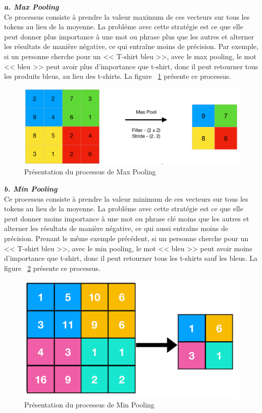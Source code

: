\noindent
{\small\textbf{\textit{a. Max Pooling }}}\mbox{}\\
Ce processus consiste à prendre la valeur maximum de ces vecteurs sur tous les tokens au lieu de la moyenne. La probléme avec cette stratégie est ce que elle peut donner plus importance à une mot ou phrase plus que les autres et alterner les résultats de manière négative, ce qui entraîne moins de précision. Par exemple, si un personne cherche pour un << T-shirt bleu >>, avec le max pooling, le mot << bleu >> peut avoir plus d'importance que t-shirt, donc il peut retourner tous les produits bleus, au lieu des t-shirts. La figure ~\ref{fig:maxpooling} présente ce processus. 

\begin{figure}[H]
\centering
\includegraphics[width=1\textwidth]{logos/max_pooling.png}
\caption{Présentation du processus de Max Pooling}
\label{fig:maxpooling}
\end{figure}

\newpage
\noindent
{\small\textbf{\textit{b. Min Pooling }}}\mbox{}\\
Ce processus consiste à prendre la valeur minimum de ces vecteurs sur tous les tokens au lieu de la moyenne. La probléme avec cette stratégie est ce que elle peut donner moins importance à une mot ou phrase clé moins que les autres et alterner les résultats de manière négative, ce qui aussi entraîne moins de précision. Prenant le même exemple précédent, si un personne cherche pour un << T-shirt bleu >>, avec le min pooling, le mot << bleu >> peut avoir moins d'importance que t-shirt, donc il peut retourner tous les t-shirts sauf les bleus. La figure ~\ref{fig:minpooling} présente ce processus. 

\begin{figure}[H]
\centering
\includegraphics[width=1\textwidth]{logos/min_pooling.png}
\caption{Présentation du processus de Min Pooling}
\label{fig:minpooling}
\end{figure}


